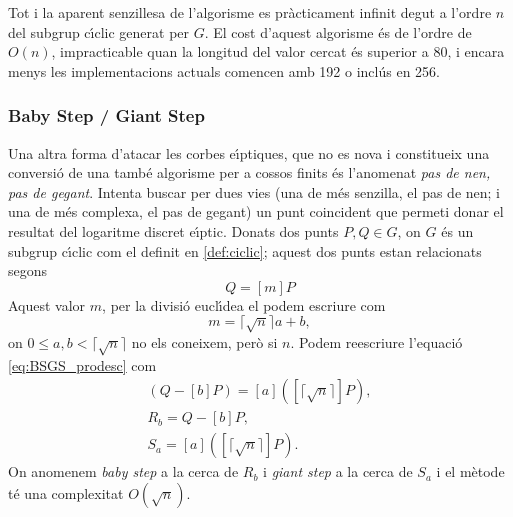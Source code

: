 \documentclass[12pt,twoside,catalan,a4paper]{book}%
\numberwithin{figure}{section}		%
\theoremstyle{definition}   			%
\def\ces{corbes e\lgem{}\'{\i}ptiques}%
\def\cfs{cossos finits}%
\def\sgc{subgrup c\'{\i}clic}%
\def\ecdlp{logaritme discret e\lgem{}\'{\i}ptic}%
\theoremstyle{saltolinea}   			%
\begin{document}
Tot i la aparent senzillesa de l'algorisme es pr\`acticament infinit degut a l'ordre $n$ del \sgc{} generat per $G$. El cost d'aquest algorisme \'es de l'ordre de $O\left(n\right)$, impracticable quan la longitud del valor cercat \'es superior a 80, i encara menys les implementacions actuals comencen amb 192 o incl\'us en 256.


\subsubsection{Baby Step / Giant Step}\label{subsec:bsgs}

Una altra forma d'atacar les \ces{}, que no es nova i constitueix una conversi\'o de una tamb\'e algorisme per a \cfs{} \'es l'anomenat \emph{pas de nen, pas de gegant}. Intenta buscar per dues vies (una de m\'es senzilla, el pas de nen; i una de m\'es complexa, el pas de gegant) un punt coincident que permeti donar el resultat del \ecdlp. Donats dos punts $P,Q \in G$, on $G$ \'es un \sgc{} com el definit en \ref{def:ciclic}; aquest dos punts estan relacionats segons
\begin{equation}\label{eq:BSGS_prodesc} Q = \left[m\right]P\end{equation}
Aquest valor $m$, per la divisi\'o eucl\'{\i}dea el podem escriure com
$$m = \lceil\sqrt{n}\rceil a + b,$$
on $0 \leq a,b < \lceil\sqrt{n}\rceil$ no els coneixem, per\`o si $n$. Podem reescriure l'equaci\'o \ref{eq:BSGS_prodesc} com
$$\begin{array}{l} \left( Q - \left[b\right]P \right) = \left[a\right] \left( \left[\lceil\sqrt{n}\rceil\right]P \right),\\ R_{b} = Q - \left[b\right]P, \\ S_{a} = \left[a\right] \left( \left[\lceil\sqrt{n}\rceil\right]P \right).\end{array}$$
On anomenem \emph{baby step} a la cerca de $R_{b}$ i \emph{giant step} a la cerca de $S_{a}$ i el m\`etode t\'e una complexitat $O\left(\sqrt{n}\right)$.
\end{document}
